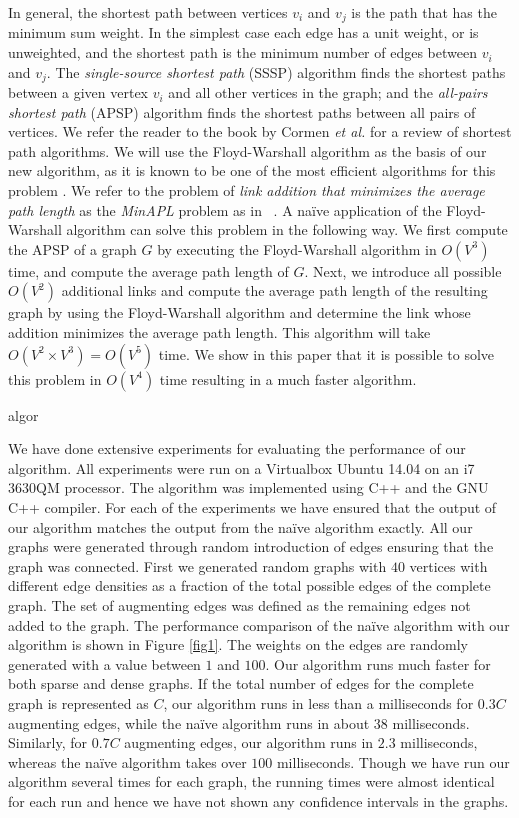 \documentclass[journal,final,twocolumn,10pt,twoside]{IEEEtranTCOM}
\begin{document}
In general, the shortest path between vertices $v_i$ and $v_j$ is the path that has the minimum sum weight. 
In the simplest case each edge has a unit weight, or is unweighted, and the shortest path is the minimum 
number of edges between $v_i$ and $v_j$. 
The {\em single-source shortest path} (SSSP) algorithm finds the shortest paths between a given 
vertex $v_i$ and 
all other vertices in the graph; and the {\em all-pairs shortest path} (APSP) algorithm finds the shortest paths 
between all pairs of vertices. We refer the reader to the book by Cormen {\em et al.}\cite{CLRS} for a review of 
shortest path algorithms. 
We will use the Floyd-Warshall algorithm as the basis of our new algorithm, as it is known to be one of the most 
efficient algorithms for this problem \cite{CLRS}. 
We refer to the problem of {\em link addition that minimizes the average path length} as the {\em MinAPL} problem 
as in ~\cite{GCM}. A na\"ive application of the Floyd-Warshall algorithm can solve this problem in the following way. 
We first compute the APSP of a graph $G$ by executing the Floyd-Warshall algorithm in $O(V^3)$ time, and compute the 
average path length of $G$. Next, we introduce all possible $O(V^2)$ additional links and compute the average 
path length of the resulting graph by using the Floyd-Warshall algorithm and determine the link whose addition 
minimizes the average path length. This algorithm will take $O(V^2\times V^3)=O(V^5)$ time. We show in this 
paper that it is possible to solve this problem in $O(V^4)$ time resulting in a much faster algorithm. 

algor


We have done extensive experiments for evaluating the performance of our algorithm. All experiments 
were run on a Virtualbox Ubuntu 14.04 on an i7 3630QM processor.  The algorithm was implemented using C++ and the GNU C++ compiler. 
For each of the experiments we have ensured that the output of our algorithm matches the output from the 
na\"ive algorithm exactly. 
All our graphs were generated through random introduction 
of edges ensuring that the graph was connected. First we generated random graphs with $40$ vertices 
with different edge densities as a fraction of the total possible edges of the complete graph. The set of augmenting edges was defined as the remaining edges not added to the graph. The 
performance comparison of the na\"ive algorithm with our algorithm is shown in Figure \ref{fig1}. The weights 
on the edges are randomly generated with a value between $1$ and $100$.
Our algorithm runs much faster for 
both sparse and dense graphs. If the total number of edges for the complete graph is represented as 
$C$, our algorithm runs in less than a milliseconds for $0.3C$ augmenting edges, while the na\"ive algorithm 
runs in about 38 milliseconds. Similarly, for $0.7C$ augmenting edges, our algorithm runs in $2.3$ milliseconds, 
whereas the na\"ive algorithm takes over $100$ milliseconds. Though we have run our algorithm several times for 
each graph, the running times were almost identical for each run and hence we have not shown any confidence intervals 
in the graphs.  
\end{document}
